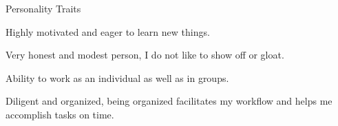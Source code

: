 \documentclass{resume} %
\begin{document}
\begin{rSection}{Personality Traits}
	\item Highly motivated and eager to learn new things.
	\item Very honest and modest person, I do not like to show off or gloat.
	\item Ability to work as an individual as well as in groups.
	\item Diligent and organized, being organized facilitates my workflow and helps me accomplish tasks on time.
\end{rSection}
\end{document}
